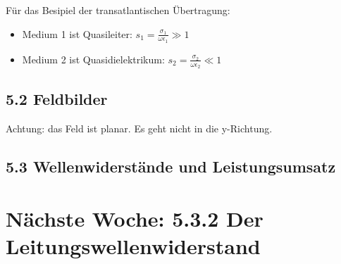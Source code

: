 \documentclass[a4paper]{article}
\begin{document}
Für das Besipiel der transatlantischen Übertragung:
\begin{itemize}
    \item Medium 1 ist Quasileiter: $ s_{1}=\frac{\sigma_{1}}{\omega\epsilon_{1}}\gg1$
    \item Medium 2 ist Quasidielektrikum: $ s_{2}=\frac{\sigma_{2}}{\omega\epsilon_{2}}\ll1$
\end{itemize}

\subsection*{5.2 Feldbilder}
Achtung: das Feld ist planar. Es geht nicht in die y-Richtung.

\subsection*{5.3 Wellenwiderstände und Leistungsumsatz}

\section*{Nächste Woche: 5.3.2 Der Leitungswellenwiderstand}
\end{document}
